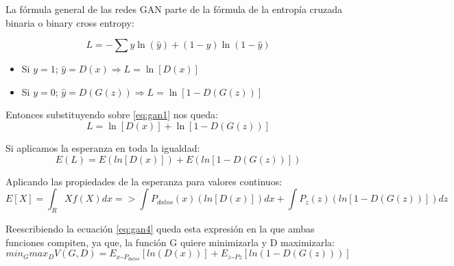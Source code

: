 La fórmula general de las redes GAN parte de la fórmula de la entropía cruzada binaria o binary cross entropy:

\begin{equation}
	L = -\sum y\ln(\hat{y}) + (1-y)\ln(1-\hat{y}) \label{eq:gan1}
\end{equation}

\begin{itemize}
	\item Si  $y = 1$; \quad $\hat{y} = D(x) \Rightarrow L = \ln[D(x)]$
	\item Si  $y = 0$; \quad $\hat{y} = D(G(z)) \Rightarrow L = \ln[1 - D(G(z))]$
\end{itemize}

Entonces substituyendo sobre \ref{eq:gan1} nos queda: 
\begin{equation}
	L = \ln[D(x)] + \ln[1 - D(G(z))] \label{eq:gan2}
\end{equation}

Si aplicamos la esperanza en toda la igualdad:
\begin{equation}
	E(L) = E(ln[D(x)]) + E(ln[1-D(G(z))]) \label{eq:gan3}
\end{equation}

Aplicando las propiedades de la esperanza para valores continuos:
\begin{equation}
 	E[X] = \int_{R} Xf(X)dx =>  \int P_{datos}(x) (ln[D(x)])dx + \int P_{z}(z)(ln[1-D(G(z))])dz \label{eq:gan4}
\end{equation}

Reescribiendo la ecuación \ref{eq:gan4} queda esta expresión en la que ambas funciones compiten, ya que, la función G quiere minimizarla y D maximizarla:
\begin{equation}
 min_G max_D V(G,D) = E_{x\text{\textasciitilde}P_{datos}}[ln(D(x))] + E_{z\text{\textasciitilde}Pz}[ln(1-D(G(z)))] \label{eq:gan5}
\end{equation}
